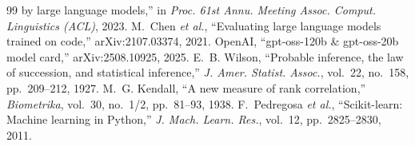 \documentclass[10pt,a4paper,twocolumn]{article}
\begin{document}
\begin{thebibliography}{99}
by large language models,'' in \emph{Proc. 61st Annu. Meeting Assoc. Comput. Linguistics (ACL)}, 2023.
 M.~Chen \emph{et al.}, ``Evaluating large language models trained on code,'' arXiv:2107.03374, 2021.
 OpenAI, ``gpt-oss-120b \& gpt-oss-20b model card,'' arXiv:2508.10925, 2025.
 E.~B. Wilson, ``Probable inference, the law of succession, and statistical inference,'' \emph{J. Amer.
Statist. Assoc.}, vol.~22, no.~158, pp.~209--212, 1927.
 M.~G. Kendall, ``A new measure of rank correlation,'' \emph{Biometrika}, vol.~30, no.~1/2,
pp.~81--93, 1938.
 F.~Pedregosa \emph{et al.}, ``Scikit-learn: Machine learning in Python,'' \emph{J. Mach. Learn.
Res.}, vol.~12, pp.~2825--2830, 2011.
\end{thebibliography}
\end{document}
